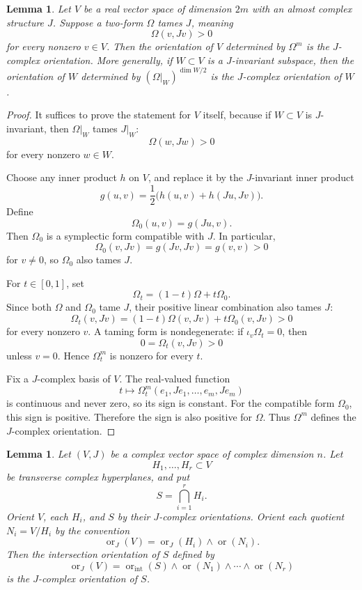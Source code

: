 \documentclass[12pt]{article}
\newtheorem{lemma}[theorem]{Lemma}
\begin{document}
\begin{lemma}\label{lem:tame-orientation}
Let \(V\) be a real vector space of dimension \(2m\) with an almost complex structure \(J\). Suppose a two-form \(\Omega\) tames \(J\), meaning
\[
\Omega(v,Jv)>0
\]
for every nonzero \(v\in V\). Then the orientation of \(V\) determined by \(\Omega^m\) is the \(J\)-complex orientation. More generally, if \(W\subset V\) is a \(J\)-invariant subspace, then the orientation of \(W\) determined by \((\Omega|_W)^{\dim W/2}\) is the \(J\)-complex orientation of \(W\).
\end{lemma}

\begin{proof}
It suffices to prove the statement for \(V\) itself, because if \(W\subset V\) is \(J\)-invariant, then \(\Omega|_W\) tames \(J|_W\):
\[
\Omega(w,Jw)>0
\]
for every nonzero \(w\in W\).

Choose any inner product \(h\) on \(V\), and replace it by the \(J\)-invariant inner product
\[
g(u,v)=\frac12\bigl(h(u,v)+h(Ju,Jv)\bigr).
\]
Define
\[
\Omega_0(u,v)=g(Ju,v).
\]
Then \(\Omega_0\) is a symplectic form compatible with \(J\). In particular,
\[
\Omega_0(v,Jv)=g(Jv,Jv)=g(v,v)>0
\]
for \(v\neq 0\), so \(\Omega_0\) also tames \(J\).

For \(t\in[0,1]\), set
\[
\Omega_t=(1-t)\Omega+t\Omega_0.
\]
Since both \(\Omega\) and \(\Omega_0\) tame \(J\), their positive linear combination also tames \(J\):
\[
\Omega_t(v,Jv)
=(1-t)\Omega(v,Jv)+t\Omega_0(v,Jv)>0
\]
for every nonzero \(v\). A taming form is nondegenerate: if \(\iota_v\Omega_t=0\), then
\[
0=\Omega_t(v,Jv)>0
\]
unless \(v=0\). Hence \(\Omega_t^m\) is nonzero for every \(t\).

Fix a \(J\)-complex basis of \(V\). The real-valued function
\[
t\longmapsto \Omega_t^m(e_1,Je_1,\dots,e_m,Je_m)
\]
is continuous and never zero, so its sign is constant. For the compatible form \(\Omega_0\), this sign is positive. Therefore the sign is also positive for \(\Omega\). Thus \(\Omega^m\) defines the \(J\)-complex orientation.
\end{proof}

\begin{lemma}\label{lem:complex-intersection}
Let \((V,J)\) be a complex vector space of complex dimension \(n\). Let
\[
H_1,\dots,H_r\subset V
\]
be transverse complex hyperplanes, and put
\[
S=\bigcap_{i=1}^r H_i.
\]
Orient \(V\), each \(H_i\), and \(S\) by their \(J\)-complex orientations. Orient each quotient \(N_i=V/H_i\) by the convention
\[
\operatorname{or}_J(V)=\operatorname{or}_J(H_i)\wedge \operatorname{or}(N_i).
\]
Then the intersection orientation of \(S\) defined by
\[
\operatorname{or}_J(V)
=
\operatorname{or}_{\mathrm{int}}(S)
\wedge
\operatorname{or}(N_1)\wedge\cdots\wedge\operatorname{or}(N_r)
\]
is the \(J\)-complex orientation of \(S\).
\end{lemma}
\end{document}

